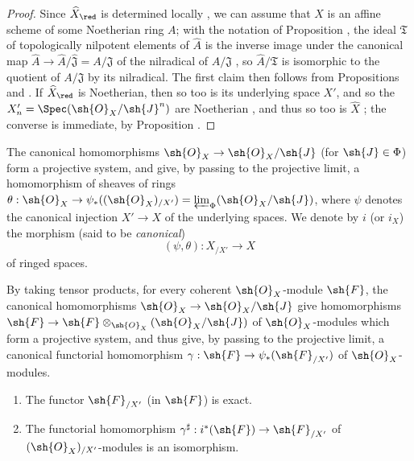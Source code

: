 
\begin{proof}
Since $\widehat{X}_\red$ is determined locally , we can assume that $X$ is an affine scheme of some Noetherian ring $A$; with the notation of Proposition , the ideal $\mathfrak{T}$ of topologically nilpotent elements of $\widehat{A}$ is the inverse image under the canonical map $\widehat{A}\to\widehat{A}/\widehat{\mathfrak{J}}=A/\mathfrak{J}$ of the nilradical of $A/\mathfrak{J}$ , so $\widehat{A}/\mathfrak{T}$ is isomorphic to the quotient of $A/\mathfrak{J}$ by its nilradical.
The first claim then follows from Propositions  and .
If $\widehat{X}_\red$ is Noetherian, then so too is its underlying space $X'$, and so the $X_n'=\Spec(\sh{O}_X/\sh{J}^n)$ are Noetherian , and thus so too is $\widehat{X}$ ; the converse is immediate, by Proposition .
\end{proof}

\begin{env}[10.8.7]
\label{I.10.8.7}
The canonical homomorphisms $\sh{O}_X\to\sh{O}_X/\sh{J}$ (for $\sh{J}\in\Phi$) form a projective system, and give, by passing to the projective limit, a homomorphism of sheaves of rings $\theta:\sh{O}_X\to\psi_*((\sh{O}_X)_{/X'})=\varprojlim_\Phi(\sh{O}_X/\sh{J})$, where $\psi$ denotes the canonical injection $X'\to X$ of the underlying spaces.
We denote by $i$ (or $i_X$) the morphism (said to be \emph{canonical})
\[
  (\psi,\theta):X_{/X'}\to X
\]
of ringed spaces.

By taking tensor products, for every coherent $\sh{O}_X$-module $\sh{F}$, the canonical homomorphisms $\sh{O}_X\to\sh{O}_X/\sh{J}$ give homomorphisms $\sh{F}\to\sh{F}\otimes_{\sh{O}_X}(\sh{O}_X/\sh{J})$ of $\sh{O}_X$-modules which form a projective system, and thus give, by passing to the projective limit, a canonical functorial homomorphism $\gamma:\sh{F}\to\psi_*(\sh{F}_{/X'})$ of $\sh{O}_X$-modules.
\end{env}

\begin{proposition}[10.8.8]
\label{I.10.8.8}
\medskip\noindent
\begin{enumerate}
  \item[\rm{(i)}] The functor $\sh{F}_{/X'}$ (in $\sh{F}$) is exact.
  \item[\rm{(ii)}] The functorial homomorphism $\gamma^\sharp:i^*(\sh{F})\to\sh{F}_{/X'}$ of $(\sh{O}_X)_{/X'}$-modules is an isomorphism.
\end{enumerate}
\end{proposition}

